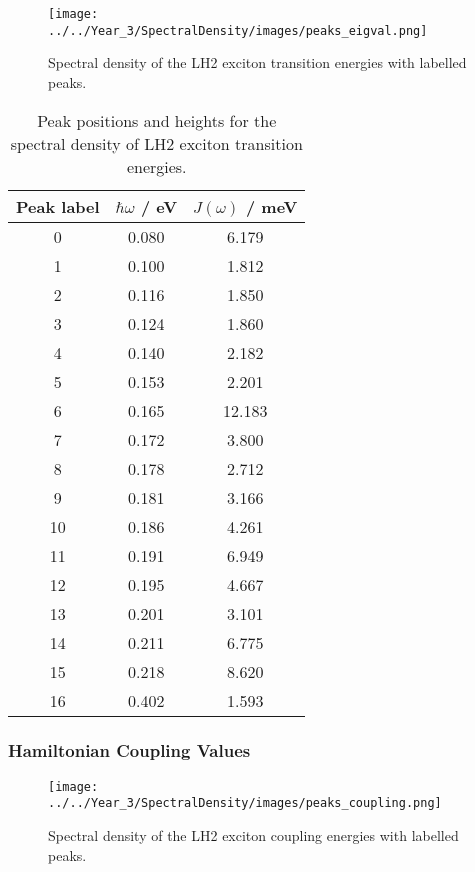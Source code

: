 \begin{figure}
    \centering
    \texttt{[image: ../../Year\_3/SpectralDensity/images/peaks\_eigval.png]}
    \caption{Spectral density of the LH2 exciton transition energies with labelled
    peaks.}
    \label{fig:exciton_lablled_peaks}
\end{figure}


\begin{table}
    \centering
    \begin{tabular}{||c c c||}
        \hline
        Peak label & $\hbar \omega$ / eV & $J\left(\omega\right)$ / meV \\
        \hline\hline
        
         0 & 0.080 & 6.179 \\
         1 & 0.100 & 1.812 \\
         2 & 0.116 & 1.850 \\
         3 & 0.124 & 1.860 \\
         4 & 0.140 & 2.182 \\
         5 & 0.153 & 2.201 \\
         6 & 0.165 & 12.183 \\
         7 & 0.172 & 3.800 \\
         8 & 0.178 & 2.712 \\
         9 & 0.181 & 3.166 \\
         10 & 0.186 & 4.261 \\
         11 & 0.191 & 6.949 \\
         12 & 0.195 & 4.667 \\
         13 & 0.201 & 3.101 \\
         14 & 0.211 & 6.775 \\
         15 & 0.218 & 8.620 \\
         16 & 0.402 & 1.593 \\
        \hline 
    \end{tabular}
    \caption{Peak positions and heights for the spectral density of LH2 exciton
    transition energies.}
    \label{tab:excitons_lablled_peaks}
\end{table}

\afterpartskip
\subsubsection{Hamiltonian Coupling Values}
\label{subsubsec:specdens_coupling}

\begin{figure}
    \centering
    \texttt{[image: ../../Year\_3/SpectralDensity/images/peaks\_coupling.png]}
    \caption{Spectral density of the LH2 exciton coupling energies with labelled
    peaks.}
    \label{fig:coupling_lablled_peaks}
\end{figure}

